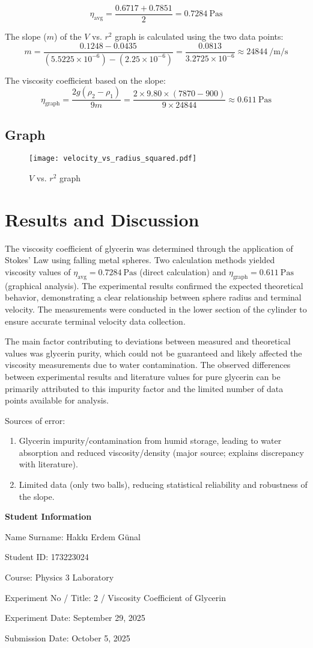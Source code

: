 \documentclass[12pt, a4paper]{article}
\begin{document}
\[ \eta_{\text{avg}} = \frac{0.6717 + 0.7851}{2} = \SI{0.7284}{\pascal\second} \]

The slope ($m$) of the $V$ vs. $r^2$ graph is calculated using the two data points:
\[ m = \frac{0.1248 - 0.0435}{(5.5225 \times 10^{-6}) - (2.25 \times 10^{-6})} = \frac{0.0813}{3.2725 \times 10^{-6}} \approx \SI{24844}{\per\metre\per\second} \]

The viscosity coefficient based on the slope:
\[ \eta_{\text{graph}} = \frac{2 g (\rho_2 - \rho_1)}{9 m} = \frac{2 \times 9.80 \times (7870 - 900)}{9 \times 24844} \approx \SI{0.611}{\pascal\second} \]

\subsection{Graph}
\begin{figure}[H]
	\centering
	\texttt{[image: velocity\_vs\_radius\_squared.pdf]}
	\caption{$V$ vs. $r^2$ graph}
\end{figure}

\section{Results and Discussion}
The viscosity coefficient of glycerin was determined through the application of Stokes' Law using falling metal spheres. Two calculation methods yielded viscosity values of $\eta_{\text{avg}} = \SI{0.7284}{\pascal\second}$ (direct calculation) and $\eta_{\text{graph}} = \SI{0.611}{\pascal\second}$ (graphical analysis). The experimental results confirmed the expected theoretical behavior, demonstrating a clear relationship between sphere radius and terminal velocity. The measurements were conducted in the lower section of the cylinder to ensure accurate terminal velocity data collection.

The main factor contributing to deviations between measured and theoretical values was glycerin purity, which could not be guaranteed and likely affected the viscosity measurements due to water contamination. The observed differences between experimental results and literature values for pure glycerin can be primarily attributed to this impurity factor and the limited number of data points available for analysis.

Sources of error:
\begin{enumerate}
	\item Glycerin impurity/contamination from humid storage, leading to water absorption and reduced viscosity/density (major source; explains discrepancy with literature).
	\item Limited data (only two balls), reducing statistical reliability and robustness of the slope.
\end{enumerate}

\newpage

\textbf{Student Information}

Name Surname: Hakkı Erdem Günal

Student ID: 173223024

Course: Physics 3 Laboratory

Experiment No / Title: 2 / Viscosity Coefficient of Glycerin

Experiment Date: September 29, 2025

Submission Date: October 5, 2025
\end{document}
